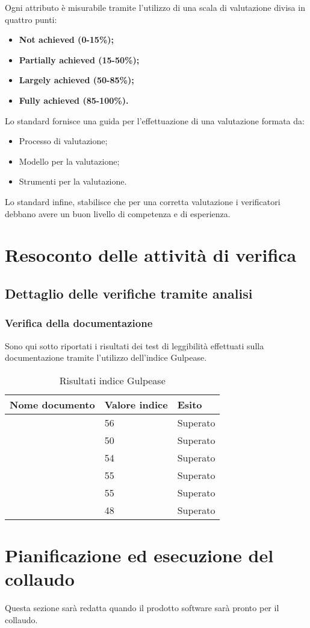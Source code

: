 	Ogni attributo è misurabile tramite l'utilizzo di una scala di valutazione divisa in quattro punti:
		\begin{itemize}
			\item \textbf{Not achieved (0-15\%);}
			\item \textbf{Partially achieved (15-50\%);}
			\item \textbf{Largely achieved (50-85\%);}
			\item \textbf{Fully achieved (85-100\%).}
		\end{itemize}
	Lo standard fornisce una guida per l'effettuazione di una valutazione formata da:
		\begin{itemize}
			\item Processo di valutazione;
			\item Modello per la valutazione;
			\item Strumenti per la valutazione.
		\end{itemize}
	Lo standard infine, stabilisce che per una corretta valutazione i verificatori debbano avere un buon livello di competenza e di esperienza.
	
\pagebreak

\section{Resoconto delle attività di verifica}
	\subsection{Dettaglio delle verifiche tramite analisi}
		\subsubsection{Verifica della documentazione}
		Sono qui sotto riportati i risultati dei test di leggibilità effettuati sulla documentazione tramite l'utilizzo dell'indice Gulpease.
		\begin{table}[!ht]
				\begin{center}
					\begin{tabularx}{0.9\textwidth}{|l|l|X|}
						\hline
						\textbf{Nome documento} & \textbf{Valore indice} & \textbf{Esito}\\
						\hline
						\docNameVersionAdR & 56 & Superato\\
						\hline
						\docNameVersionGlo & 50 & Superato\\
						\hline
						\docNameVersionNdP & 54 & Superato\\
						\hline
						\docNameVersionPdP & 55 & Superato\\
						\hline
						\docNameVersionPdQ & 55 & Superato \\
						\hline
						\docNameVersionSdF & 48 & Superato\\
						\hline
					\end{tabularx}
				\end{center}
			\caption{Risultati indice Gulpease}
			\end{table}
			
\pagebreak

\section{Pianificazione ed esecuzione del collaudo}
	Questa sezione sarà redatta quando il prodotto software sarà pronto per il collaudo.
	
	\pagebreak